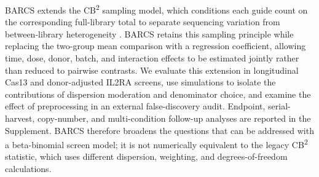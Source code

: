 BARCS extends the CB\textsuperscript{2} sampling model, which conditions each
guide count on the corresponding full-library total to separate sequencing
variation from between-library heterogeneity \citep{jeong2019beta}.  BARCS
retains this sampling principle while replacing the two-group mean comparison
with a regression coefficient, allowing time, dose, donor, batch, and
interaction effects to be estimated jointly rather than reduced to pairwise
contrasts.  We evaluate this extension in longitudinal Cas13 and donor-adjusted
IL2RA screens, use simulations to isolate the contributions of dispersion
moderation and denominator choice, and examine the effect of preprocessing in
an external false-discovery audit.  Endpoint, serial-harvest, copy-number, and
multi-condition follow-up analyses are reported in the Supplement.  BARCS
therefore broadens the questions that can be addressed with a beta-binomial
screen model; it is not numerically equivalent to the legacy
CB\textsuperscript{2} statistic, which uses different dispersion, weighting,
and degrees-of-freedom calculations.
